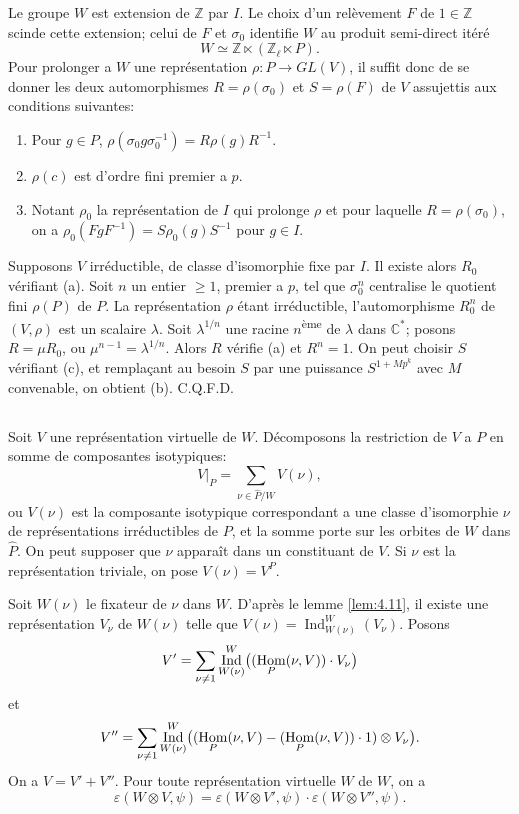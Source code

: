 \documentclass[12pt,a4paper]{article}
\theoremstyle{plain}
\theoremstyle{definition}
\theoremstyle{remark}
\DeclareMathOperator{\Ind}{Ind}
\DeclareMathOperator{\Hom}{Hom}
\newcommand{\bZ}{\mathbb{Z}}
\newcommand{\bC}{\mathbb{C}}
\let\dim\relax\let\det\relax
\providecommand{\Hom}{\operatorname{Hom}}
\begin{document}
Le groupe $W$ est extension de $\bZ$ par $I$. Le choix d'un rel\`evement $F$ de $1 \in \bZ$ scinde cette extension; celui de $F$ et $\sigma_0$ identifie $W$ au produit semi-direct it\'er\'e
\[
W \simeq \bZ \ltimes (\bZ_\ell \ltimes P).
\]
Pour prolonger a $W$ une repr\'esentation $\rho: P \to GL(V)$, il suffit donc de se donner les deux automorphismes $R = \rho(\sigma_0)$ et $S = \rho(F)$ de $V$ assujettis aux conditions suivantes:
\begin{enumerate}[label=(\alph*)]
\item Pour $g \in P$, $\rho(\sigma_0 g \sigma_0^{-1}) = R \rho(g) R^{-1}$.
\item $\rho(c)$ est d'ordre fini premier a $p$.
\item Notant $\rho_0$ la repr\'esentation de $I$ qui prolonge $\rho$ et pour laquelle $R = \rho(\sigma_0)$, on a $\rho_0(F g F^{-1}) = S \rho_0(g) S^{-1}$ pour $g \in I$.
\end{enumerate}

Supposons $V$ irr\'eductible, de classe d'isomorphie fixe par $I$. Il existe alors $R_0$ v\'erifiant (a). Soit $n$ un entier $\geq 1$, premier a $p$, tel que $\sigma_0^n$ centralise le quotient fini $\rho(P)$ de $P$. La repr\'esentation $\rho$ \'etant irr\'eductible, l'automorphisme $R_0^n$ de $(V, \rho)$ est un scalaire $\lambda$. Soit $\lambda^{1/n}$ une racine $n$\textsuperscript{\`eme} de $\lambda$ dans $\bC^*$; posons $R = \mu R_0$, ou $\mu^{n-1} = \lambda^{1/n}$. Alors $R$ v\'erifie (a) et $R^n = 1$. On peut choisir $S$ v\'erifiant (c), et rempla\c{c}ant au besoin $S$ par une puissance $S^{1 + Mp^k}$ avec $M$ convenable, on obtient (b). C.Q.F.D.


\subsection{}
\label{sec:4.13}

Soit $V$ une repr\'esentation virtuelle de $W$. D\'ecomposons la restriction de $V$ a $P$ en somme de composantes isotypiques:
\[
V|_P = \sum_{\nu \in \hat{P}/W} V(\nu),
\]
ou $V(\nu)$ est la composante isotypique correspondant a une classe d'isomorphie $\nu$ de repr\'esentations irr\'eductibles de $P$, et la somme porte sur les orbites de $W$ dans $\hat{P}$. On peut supposer que $\nu$ appara\^it dans un constituant de $V$. Si $\nu$ est la repr\'esentation triviale, on pose $V(\nu) = V^P$.

Soit $W(\nu)$ le fixateur de $\nu$ dans $W$. D'apr\`es le lemme \ref{lem:4.11}, il existe une repr\'esentation $V_\nu$ de $W(\nu)$ telle que $V(\nu) = \Ind_{W(\nu)}^W(V_\nu)$. Posons
\[
V' = \sum_{\nu \neq 1} \Ind_{W(\nu)}^W\bigl((\dim \Hom_P(\nu, V)) \cdot V_\nu\bigr)
\]
et
\[
V'' = \sum_{\nu \neq 1} \Ind_{W(\nu)}^W\bigl((\Hom_P(\nu, V) - (\dim \Hom_P(\nu, V)) \cdot 1) \otimes V_\nu\bigr).
\]
On a $V = V' + V''$. Pour toute repr\'esentation virtuelle $W$ de $W$, on a
\[
\varepsilon(W \otimes V, \psi) = \varepsilon(W \otimes V', \psi) \cdot \varepsilon(W \otimes V'', \psi).
\]
\end{document}
